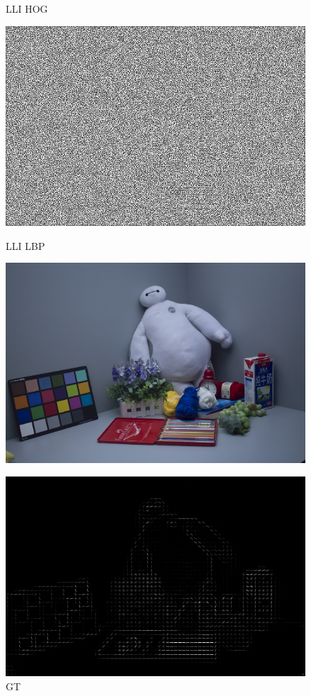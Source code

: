 \documentclass[CJK,aspectratio=169]{beamer}  %
\begin{document}
\begin{frame}
\begin{figure}
\begin{minipage}{.32\textwidth}
				\captionsetup{font=scriptsize}
				\label{fig: LLI_hog1}	
				\caption*{LLI HOG}
			\end{minipage}
			\begin{minipage}{.32\textwidth}
				\centering
				\includegraphics[width=.8\linewidth]{picture/LLIE/My Architecture/Edge Detection/low00269_lbp}
				\captionsetup{font=scriptsize}
				\label{fig: LLI_lbp1}	
				\caption*{LLI LBP}
			\end{minipage}
			\begin{minipage}{.32\textwidth}
				\centering
				\includegraphics[width=.8\linewidth]{picture/LLIE/My Architecture/Edge Detection/normal00269}
				\captionsetup{font=scriptsize}
				\label{fig: GI1}
				\caption*{GT}
			\end{minipage}
			\begin{minipage}{.32\textwidth}
				\centering
				\includegraphics[width=.8\linewidth]{picture/LLIE/My Architecture/Edge Detection/normal00269_hog}

\end{minipage}
\end{figure}
\end{frame}
\end{document}
